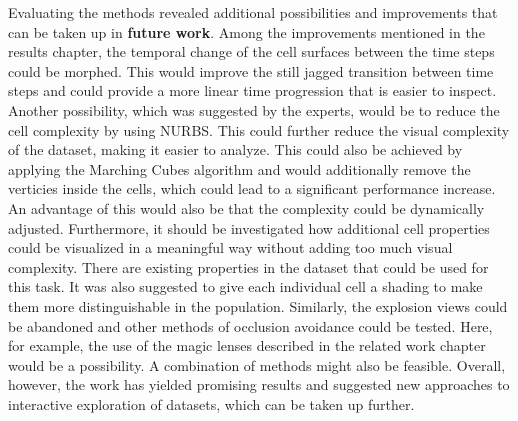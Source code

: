Evaluating the methods revealed additional possibilities and improvements that can be taken up in \textbf{future work}. Among the improvements mentioned in the results chapter, the temporal change of the cell surfaces between the time steps could be morphed. This would improve the still jagged transition between time steps and could provide a more linear time progression that is easier to inspect. Another possibility, which was suggested by the experts, would be to reduce the cell complexity by using NURBS.
This could further reduce the visual complexity of the dataset, making it easier to analyze. This could also be achieved by applying the Marching Cubes algorithm and would additionally remove the verticies inside the cells, which could lead to a significant performance increase. An advantage of this would also be that the complexity could be dynamically adjusted.
Furthermore, it should be investigated how additional cell properties could be visualized in a meaningful way without adding too much visual complexity. There are existing properties in the dataset that could be used for this task. It was also suggested to give each individual cell a shading to make them more distinguishable in the population. 
Similarly, the explosion views could be abandoned and other methods of occlusion avoidance could be tested. Here, for example, the use of the magic lenses described in the related work chapter would be a possibility. A combination of methods might also be feasible.
Overall, however, the work has yielded promising results and suggested new approaches to interactive exploration of datasets, which can be taken up further.